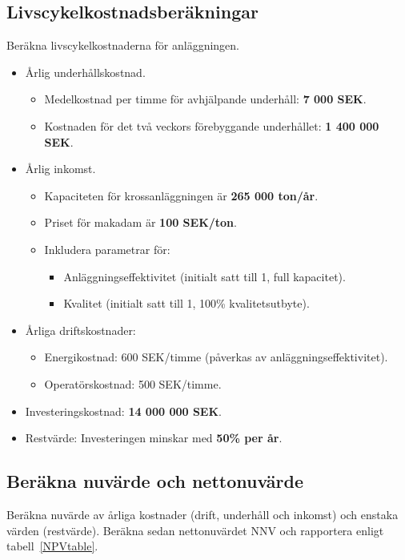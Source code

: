 \documentclass[a4paper,12pt]{exam}
\begin{document}
\subsection{Livscykelkostnadsberäkningar}
Beräkna livscykelkostnaderna för anläggningen.
\begin{itemize}
    \item Årlig underhållskostnad.
    \begin{itemize}
    \item Medelkostnad per timme för avhjälpande underhåll: \textbf{7 000 SEK}. 
    \item Kostnaden för det två veckors förebyggande underhållet: \textbf{1 400 000 SEK}. 
    \end{itemize}    
    \item Årlig inkomst. 
    \begin{itemize}
    \item Kapaciteten för krossanläggningen är \textbf{265 000 ton/år}.
    \item Priset för makadam är \textbf{100 SEK/ton}.
    \item Inkludera parametrar för: 
    \begin{itemize}
        \item Anläggningseffektivitet (initialt satt till 1, full kapacitet).
        \item Kvalitet (initialt satt till 1, 100\% kvalitetsutbyte).
    \end{itemize}
    \end{itemize}
    \item Årliga driftskostnader:
    \begin{itemize}
        \item Energikostnad: 600 SEK/timme (påverkas av anläggningseffektivitet).
        \item Operatörskostnad: 500 SEK/timme.
    \end{itemize}
    \item Investeringskostnad: \textbf{14 000 000 SEK}.
    \item Restvärde: Investeringen minskar med \textbf{50\% per år}.
\end{itemize}

\subsection{Beräkna nuvärde och nettonuvärde}
Beräkna nuvärde av årliga kostnader (drift, underhåll och inkomst) och enstaka värden (restvärde). Beräkna sedan nettonuvärdet NNV och rapportera enligt tabell~\ref{NPVtable}.
\end{document}
